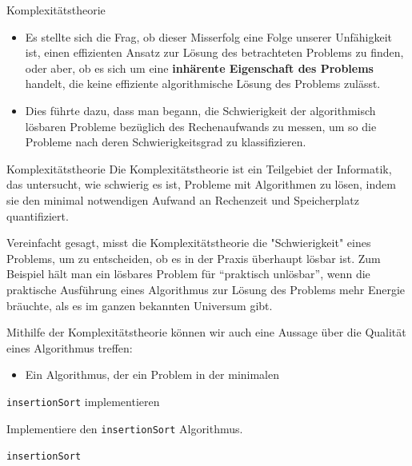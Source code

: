 \begin{frame}{Komplexitätstheorie}
	\begin{itemize}[<+->]
		\item Es stellte sich die Frag, ob dieser Misserfolg eine Folge unserer Unfähigkeit ist, einen effizienten Ansatz zur Lösung des betrachteten Problems zu finden, oder aber, ob es sich um eine \textbf{inhärente Eigenschaft des Problems} handelt, die keine effiziente algorithmische Lösung des Problems zulässt.
		\item  Dies führte dazu, dass man begann, die Schwierigkeit der algorithmisch lösbaren Probleme bezüglich des Rechenaufwands zu messen, um so die Probleme nach deren Schwierigkeitsgrad zu klassifizieren.
	\end{itemize}
\end{frame}

\begin{frame}{Komplexitätstheorie}
	Die Komplexitätstheorie ist ein Teilgebiet der Informatik, das untersucht, wie schwierig es ist, Probleme mit Algorithmen zu lösen, indem sie den minimal notwendigen Aufwand an Rechenzeit und Speicherplatz quantifiziert. 
	
	Vereinfacht gesagt, misst die Komplexitätstheorie die "Schwierigkeit" eines Problems, um zu entscheiden, ob es in der Praxis überhaupt lösbar ist. Zum Beispiel hält man ein lösbares Problem für \enquote{praktisch unlösbar}, wenn die praktische Ausführung eines Algorithmus zur Lösung des Problems mehr Energie bräuchte, als es im ganzen bekannten Universum gibt.
\end{frame}

\begin{frame}
	Mithilfe der Komplexitätstheorie können wir auch eine Aussage über die Qualität eines Algorithmus treffen: 
	\begin{itemize}
		\item Ein Algorithmus, der ein Problem in der minimalen 
	\end{itemize}
\end{frame}


\begin{frame}{\texttt{insertionSort} implementieren}
	\begin{myexercise}\label{myexercise:insertionSort}
		Implementiere den \texttt{insertionSort} Algorithmus.
	\end{myexercise}
\end{frame}

\begin{frame}{\texttt{insertionSort}}
	\begin{myanswer}
		
	\end{myanswer}
\end{frame}

